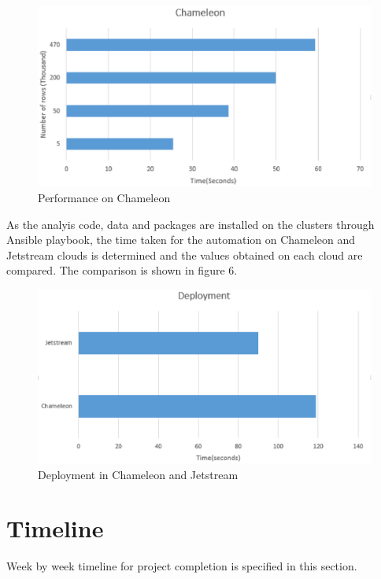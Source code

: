 \documentclass[9pt,twocolumn,twoside]{../../styles/osajnl}
\begin{document}
\begin{figure}[ht]
  \includegraphics[scale=0.50]{images/ccBench.eps}
  \caption{Performance on Chameleon}
\end{figure}

As the analyis code, data and packages are installed on the clusters
through Ansible playbook, the time taken for the automation on
Chameleon and Jetstream clouds is determined and the values obtained
on each cloud are compared. The comparison is shown in figure 6.

\begin{figure}[ht]
  \includegraphics[scale=0.50]{images/CcVsJs.eps}
  \caption{Deployment in Chameleon and Jetstream}
\end{figure}

\section{Timeline}

Week by week timeline for project completion is specified in this section.
\end{document}

